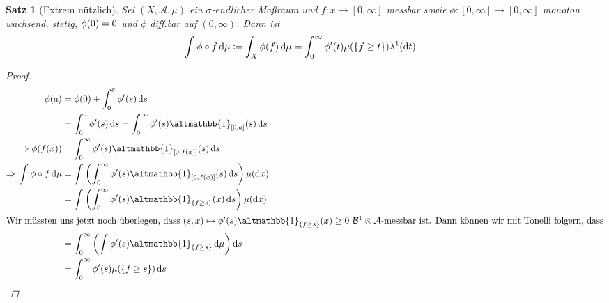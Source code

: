 \documentclass[11pt, twoside, a4paper]{article}
\theoremstyle{plain}
\newtheorem{satz}[blockelement]{Satz}
\numberwithin{equation}{subsection}
\newcommand{\set}[1]{\left\{#1\right\}}
\newcommand{\pair}[1]{\left(#1\right)}
\newcommand{\of}[1]{\mathopen{}\mathclose{}\bgroup\left(#1\aftergroup\egroup\right)}
\newcommand{\interv}[1]{\left[#1\right]}
\newcommand{\impl}[0]{\Rightarrow{}}
\newcommand{\dif}{\mathop{}\!\mathrm{d}}
\newcommand{\charfunc}{\altmathbb{1}}
\newcommand{\mA}{\mathcal{A}}
\newcommand{\mB}{\mathcal{B}}
\begin{document}
    \begin{satz}[Extrem nützlich] %
        Sei $\pair{X, \mA, \mu}$ ein $\sigma$-endlicher Maßraum und $f: x\to\interv{0, \infty}$ messbar sowie $\phi: \interv{0, \infty}\to\interv{0,\infty}$ monoton wachsend, stetig, $\phi\of{0} = 0$ und $\phi$ diff.bar auf $\pair{0, \infty}$. Dann ist
        \begin{align*}
            \int_{}^{} \phi\circ f \dif \mu &\coloneqq \int_{X}^{} \phi\of{f} \dif \mu = \int_{0}^{\infty} \phi'\of{t}\mu\of{\set{f\geq t}}\lambda^1\of{\dif t}
        \end{align*}

        \begin{proof}
            \begin{align*}
                \phi\of{a} &= \phi\of{0} + \int_{0}^{a} \phi'\of{s} \dif s\\
                &= \int_{0}^{a} \phi'\of{s} \dif s = \int_{0}^{\infty} \phi'\of{s}\charfunc_{\interv{0, a}}\of{s} \dif s\\
                \impl \phi\of{f\of{x}} &= \int_{0}^{\infty} \phi'\of{s}\charfunc_{\interv{0, f\of{x}}}\of{s} \dif s\\
                \impl \int_{}^{} \phi\circ f \dif \mu &= \int_{}^{} \pair{ \int_{0}^{\infty} \phi'\of{s}\charfunc_{\interv{0, f\of{x}}}\of{s} \dif s} \mu\of{\dif x}\\
                &= \int_{}^{} \pair{ \int_{0}^{\infty} \phi'\of{s}\charfunc_{\set{f\geq s}}\of{x} \dif s} \mu\of{\dif x}\\
                \intertext{Wir müssten uns jetzt noch überlegen, dass $\pair{s, x}\mapsto \phi'\of{s}\charfunc_{\set{f\geq s}}\of{x} \geq 0$ $\mB^1\otimes \mA$-messbar ist. Dann können wir mit Tonelli folgern, dass}
                &= \int_{0}^{\infty} \pair{ \int_{}^{} \phi'\of{s}\charfunc_{\set{f\geq s}} \dif \mu} \dif s\\
                &= \int_{0}^{\infty} \phi'\of{s}\mu\of{\set{f\geq s}} \dif s\qedhere
            \end{align*}
        \end{proof}


\end{satz}
\end{document}
